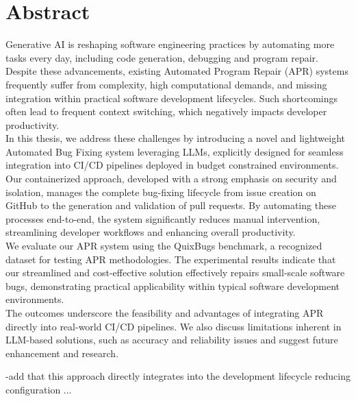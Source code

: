 \thispagestyle{empty}       %

\section*{Abstract}
Generative AI is reshaping software engineering practices by automating more tasks every day, including code generation, debugging and program repair. Despite these advancements, existing Automated Program Repair (APR) systems frequently suffer from complexity, high computational demands, and missing integration within practical software development lifecycles. Such shortcomings often lead to frequent context switching, which negatively impacts developer productivity. \\
In this thesis, we address these challenges by introducing a novel and lightweight Automated Bug Fixing system leveraging LLMs, explicitly designed for seamless integration into CI/CD pipelines deployed in budget constrained environments. Our containerized approach, developed with a strong emphasis on security and isolation, manages the complete bug-fixing lifecycle from issue creation on GitHub to the generation and validation of pull requests. By automating these processes end-to-end, the system significantly reduces manual intervention, streamlining developer workflows and enhancing overall productivity.\\
We evaluate our APR system using the QuixBugs benchmark, a recognized dataset for testing APR methodologies. The experimental results indicate that our streamlined and cost-effective solution effectively repairs small-scale software bugs, demonstrating practical applicability within typical software development environments. \\
The outcomes underscore the feasibility and advantages of integrating APR directly into real-world CI/CD pipelines. We also discuss limitations inherent in LLM-based solutions, such as accuracy and reliability issues and suggest future enhancement and research.


-add that this approach directly integrates into the development lifecycle reducing configuration ...